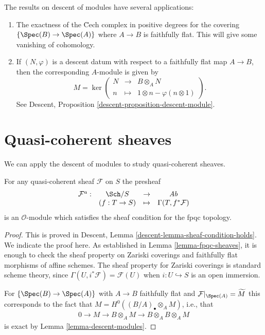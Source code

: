 \begin{remarks}
\label{remarks-theorem-modules-exactness}
The results on descent of modules have several applications:
\begin{enumerate}
\item The exactness of the \u Cech complex in positive degrees for
the covering $\{\Spec(B) \to \Spec(A)\}$ where $A \to B$ is
faithfully flat. This will give some vanishing of cohomology.
\item If $(N, \varphi)$ is a descent datum with respect to a faithfully
flat map $A \to B$, then the corresponding $A$-module is given by
$$
M = \ker \left(
\begin{matrix}
N & \longrightarrow & B \otimes_A N \\
n & \longmapsto & 1 \otimes n - \varphi(n \otimes 1)
\end{matrix}
\right).
$$
See
Descent, Proposition \ref{descent-proposition-descent-module}.
\end{enumerate}
\end{remarks}




\section{Quasi-coherent sheaves}
\label{section-quasi-coherent}

\noindent
We can apply the descent of modules to study quasi-coherent sheaves.

\begin{proposition}
\label{proposition-quasi-coherent-sheaf-fpqc}
For any quasi-coherent sheaf $\mathcal{F}$ on $S$ the presheaf
$$
\begin{matrix}
\mathcal{F}^a : & \Sch/S & \to & \textit{Ab}\\
& (f: T \to S) & \mapsto & \Gamma(T, f^*\mathcal{F})
\end{matrix}
$$
is an $\mathcal{O}$-module which satisfies the sheaf condition for the
fpqc topology.
\end{proposition}

\begin{proof}
This is proved in
Descent, Lemma \ref{descent-lemma-sheaf-condition-holds}.
We indicate the proof here. As established in
Lemma \ref{lemma-fpqc-sheaves},
it is enough to check the sheaf property
on Zariski coverings and faithfully flat morphisms of affine schemes. The
sheaf property for Zariski coverings is standard scheme theory, since
$\Gamma(U, i^\ast \mathcal{F}) = \mathcal{F}(U)$ when
$i : U \hookrightarrow S$ is an open immersion.

\medskip\noindent
For $\left\{\Spec(B)\to \Spec(A)\right\}$ with $A\to B$ faithfully
flat and
$\mathcal{F}|_{\Spec(A)} = \widetilde{M}$
this corresponds to the fact that
$M = H^0\left((B/A)_\bullet \otimes_A M \right)$, i.e., that
\begin{align*}
0 \to M \to B \otimes_A M \to B \otimes_A B \otimes_A M
\end{align*}
is exact by
Lemma \ref{lemma-descent-modules}.
\end{proof}

